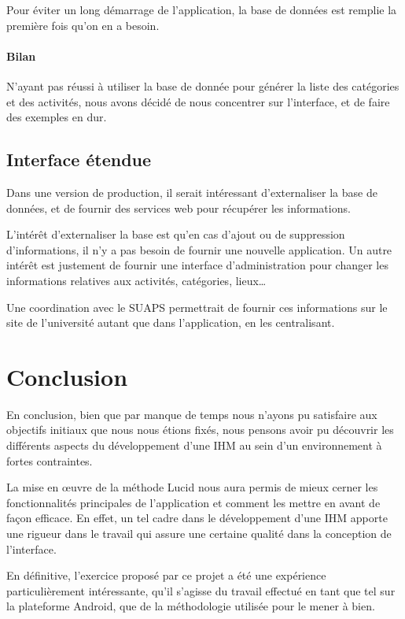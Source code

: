 \documentclass{article}
\begin{document}
        Pour éviter un long démarrage de l'application, la base de données est
        remplie la première fois qu'on en a besoin.

        \paragraph{Bilan} N'ayant pas réussi à utiliser la base de donnée pour
        générer la liste des catégories et des activités, nous avons décidé de
        nous concentrer sur l'interface, et de faire des exemples en dur.


    \subsection{Interface étendue}

        Dans une version de production, il serait intéressant d'externaliser la
        base de données, et de fournir des services web pour récupérer les
        informations.

        L'intérêt d'externaliser la base est qu'en cas d'ajout ou de suppression
        d'informations, il n'y a pas besoin de fournir une nouvelle application.
        Un autre intérêt est justement de fournir une interface d'administration
        pour changer les informations relatives aux activités, catégories,
        lieux\dots

        Une coordination avec le SUAPS permettrait de fournir ces informations
        sur le site de l'université autant que dans l'application, en les centralisant.


\section*{Conclusion}

En conclusion, bien que par manque de temps nous n'ayons pu satisfaire aux
objectifs initiaux que nous nous étions fixés, nous pensons avoir pu découvrir
les différents aspects du développement d'une IHM au sein d'un environnement à
fortes contraintes.

La mise en œuvre de la méthode Lucid nous aura permis de mieux cerner
les fonctionnalités principales de l'application et comment les mettre en avant
de façon efficace.
En effet, un tel cadre dans le développement d'une IHM apporte une rigueur dans
le travail qui assure une certaine qualité dans la conception de l'interface.

En définitive, l'exercice proposé par ce projet a été une expérience
particulièrement intéressante, qu'il s'agisse du travail effectué en tant que
tel sur la plateforme Android, que de la méthodologie utilisée pour le mener à
bien.
\end{document}
